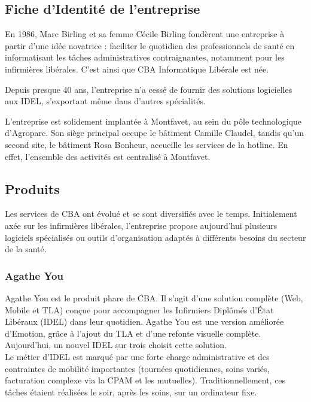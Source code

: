\documentclass{article}
\begin{document}
\subsection{Fiche d'Identité de l'entreprise}

En 1986, Marc Birling et sa femme Cécile Birling fondèrent une entreprise à partir d'une idée novatrice : faciliter le quotidien des professionnels de santé en informatisant les tâches administratives contraignantes, notamment pour les infirmières libérales. C'est ainsi que CBA Informatique Libérale est née.

Depuis presque 40 ans, l'entreprise n'a cessé de fournir des solutions logicielles aux IDEL, s'exportant même dans d'autres spécialités.

L'entreprise est solidement implantée à Montfavet, au sein du pôle technologique d'Agroparc. Son siège principal occupe le bâtiment Camille Claudel, tandis qu'un second site, le bâtiment Rosa Bonheur, accueille les services de la hotline. En effet, l'ensemble des activités est centralisé à Montfavet.

\subsection{Produits}

Les services de CBA ont évolué et se sont diversifiés avec le temps. Initialement axée sur les infirmières libérales, l'entreprise propose aujourd'hui plusieurs logiciels spécialisés ou outils d'organisation adaptés à différents besoins du secteur de la santé.

\subsubsection{Agathe You}

Agathe You est le produit phare de CBA. Il s'agit d'une solution complète (Web, Mobile et TLA) conçue pour accompagner les Infirmiers Diplômés d'État Libéraux (IDEL) dans leur quotidien.
Agathe You est une version améliorée d'Emotion, grâce à l'ajout du TLA et d'une refonte visuelle complète.
Aujourd'hui, un nouvel IDEL sur trois choisit cette solution.\\

Le métier d'IDEL est marqué par une forte charge administrative et des contraintes de mobilité importantes (tournées quotidiennes, soins variés, facturation complexe via la CPAM et les mutuelles). Traditionnellement, ces tâches étaient réalisées le soir, après les soins, sur un ordinateur fixe.
\end{document}
